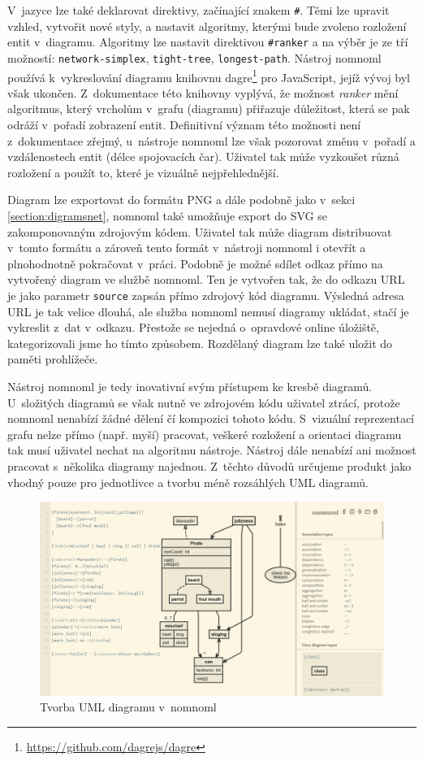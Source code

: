 V~jazyce lze také deklarovat direktivy, začínající znakem \texttt{\#}. Těmi lze
upravit vzhled, vytvořit nové styly, a nastavit algoritmy, kterými bude zvoleno
rozložení entit v~diagramu. Algoritmy lze nastavit direktivou \texttt{\#ranker}
a na výběr je ze tří možností: \texttt{network-simplex}, \texttt{tight-tree},
\texttt{longest-path}. Nástroj nomnoml používá k~vykreslování diagramu knihovnu
dagre\footnote{\url{https://github.com/dagrejs/dagre}} pro JavaScript, jejíž
vývoj byl však ukončen. Z~dokumentace této knihovny vyplývá, že možnost
\emph{ranker} mění algoritmus, který vrcholům v~grafu (diagramu) přiřazuje
důležitost, která se pak odráží v~pořadí zobrazení entit. Definitivní význam
této možnosti není z~dokumentace zřejmý, u~nástroje nomnoml lze však pozorovat
změnu v~pořadí a vzdálenostech entit (délce spojovacích čar). Uživatel tak může
vyzkoušet různá rozložení a použít to, které je vizuálně nejpřehlednější.

Diagram lze exportovat do formátu PNG a dále podobně jako v~sekci
\ref{section:digramsnet}, nomnoml také umožňuje export do SVG se zakomponovaným
zdrojovým kódem. Uživatel tak může diagram distribuovat v~tomto formátu a
zároveň tento formát v~nástroji nomnoml i otevřít a plnohodnotně pokračovat
v~práci. Podobně je možné sdílet odkaz přímo na vytvořený diagram ve službě
nomnoml. Ten je vytvořen tak, že do odkazu URL je jako parametr \texttt{source}
zapsán přímo zdrojový kód diagramu. Výsledná adresa URL je tak velice dlouhá,
ale služba nomnoml nemusí diagramy ukládat, stačí je vykreslit z~dat v~odkazu.
Přestože se nejedná o~opravdové online úložiště, kategorizovali jsme ho tímto
způsobem. Rozdělaný diagram lze také uložit do paměti prohlížeče.

Nástroj nomnoml je tedy inovativní svým přístupem ke kresbě diagramů.
U~složitých diagramů se však nutně ve zdrojovém kódu uživatel ztrácí, protože
nomnoml nenabízí žádné dělení čí kompozici tohoto kódu. S~vizuální reprezentací
grafu nelze přímo (např. myší) pracovat, veškeré rozložení a orientaci diagramu
tak musí uživatel nechat na algoritmu nástroje. Nástroj dále nenabízí ani
možnost pracovat s~několika diagramy najednou. Z~těchto důvodů určujeme produkt
jako vhodný pouze pro jednotlivce a tvorbu méně rozsáhlých UML diagramů.

\begin{figure}
  \centering
  \includegraphics[width=\textwidth]{../img/nomnoml.png}
  \caption{Tvorba UML diagramu v~nomnoml}
  \label{fig:nomnoml}
\end{figure}


